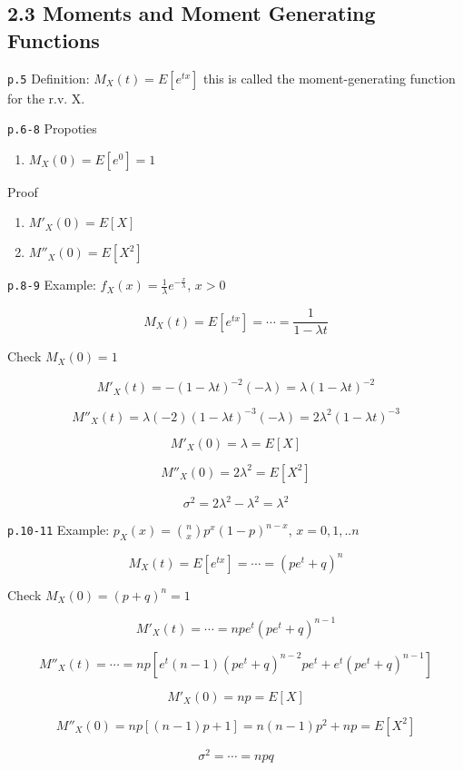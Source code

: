 \documentclass[]{tufte-book}
\providecommand{\tightlist}{%
  \setlength{\itemsep}{0pt}\setlength{\parskip}{0pt}}
\begin{document}
\hypertarget{moments-and-moment-generating-functions}{%
\subsection{2.3 Moments and Moment Generating
Functions}\label{moments-and-moment-generating-functions}}

\texttt{p.5} Definition: \(M_X(t)=E[e^{tx}]\) this is called the
moment-generating function for the r.v. X.

\texttt{p.6-8} Propoties

\begin{enumerate}
\def\labelenumi{\arabic{enumi}.}
\tightlist
\item
  \(M_X(0)=E[e^{0}]=1\)
\end{enumerate}

Proof

\begin{enumerate}
\def\labelenumi{\arabic{enumi}.}
\setcounter{enumi}{1}
\tightlist
\item
  \(M'_X(0)=E[X]\)
\item
  \(M''_X(0)=E[X^2]\)
\end{enumerate}

\texttt{p.8-9} Example: \(f_X(x)=\frac1\lambda e^{-\frac{x}\lambda}\),
\(x>0\)

\[M_X(t)=E[e^{tx}]=\cdots=\frac1{1-\lambda t}\]

Check \(M_X(0)=1\)

\[M'_X(t)=-(1-\lambda t)^{-2}(-\lambda)=\lambda(1-\lambda t)^{-2}\]

\[M''_X(t)=\lambda(-2)(1-\lambda t)^{-3}(-\lambda)=2\lambda^2(1-\lambda t)^{-3}\]

\[M'_X(0)=\lambda=E[X]\]

\[M''_X(0)=2\lambda^2=E[X^2]\]

\[\sigma^2=2\lambda^2-\lambda^2=\lambda^2\]

\texttt{p.10-11} Example: \(p_X(x)=\binom{n}xp^x(1-p)^{n-x}\),
\(x=0,1,..n\)

\[M_X(t)=E[e^{tx}]=\cdots={(pe^t+q)^n}\]

Check \(M_X(0)=(p+q)^n=1\)

\[M'_X(t)=\cdots=npe^t(pe^t+q)^{n-1}\]

\[M''_X(t)=\cdots=np[e^t(n-1)(pe^t+q)^{n-2}pe^t+e^t(pe^t+q)^{n-1}]\]

\[M'_X(0)=np=E[X]\]

\[M''_X(0)=np[(n-1)p+1]=n(n-1)p^2+np=E[X^2]\]

\[\sigma^2=\cdots=npq\]
\end{document}
